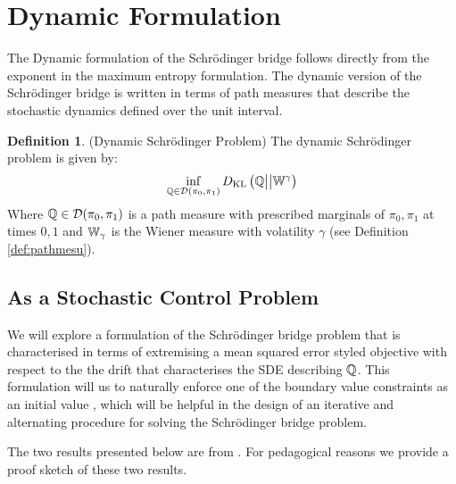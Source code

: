 \documentclass[a4paper,12pt,twoside,openright]{report}
\theoremstyle{definition}
\newtheorem{definition}{Definition}[section]
\begin{document}
\section{Dynamic Formulation}
The Dynamic formulation of the Schrödinger bridge follows directly from the exponent in the maximum entropy formulation.  The dynamic version of the Schrödinger bridge is written in terms of path measures that describe the stochastic dynamics defined over the unit interval.
\begin{definition}
    (Dynamic Schrödinger Problem) The dynamic Schrödinger problem is given by:
    \begin{align}
        \inf_{{\mathbb{Q}} \in {\mathcal{D}}(\pi_0, \pi_1)} D_{\mathrm{KL}}\left({\mathbb{Q}} \big|\big| \mathbb{W}^{\gamma}\right)
    \end{align}
    Where ${\mathbb{Q}} \in {\mathcal{D}}(\pi_0, \pi_1)$ is a path measure with prescribed marginals of $\pi_0, \pi_1$ at times $0, 1$ and $\mathbb{W}_{\gamma}$ is the Wiener measure with volatility $\gamma$ (see Definition \ref{def:pathmesu}). 
\end{definition}
\subsection{As a Stochastic Control Problem}

We will explore a formulation of the Schrödinger bridge problem that is characterised in terms of extremising a mean squared error styled objective with respect to the the drift that characterises the SDE describing ${\mathbb{Q}}$. This formulation will us to naturally enforce one of the boundary value constraints as an initial value , which will be helpful in the design of an iterative and alternating procedure for solving the Schrödinger bridge problem.

The two results presented below are from \cite{pavon1991free}. For pedagogical reasons we provide a proof sketch of these two results.
\end{document}
